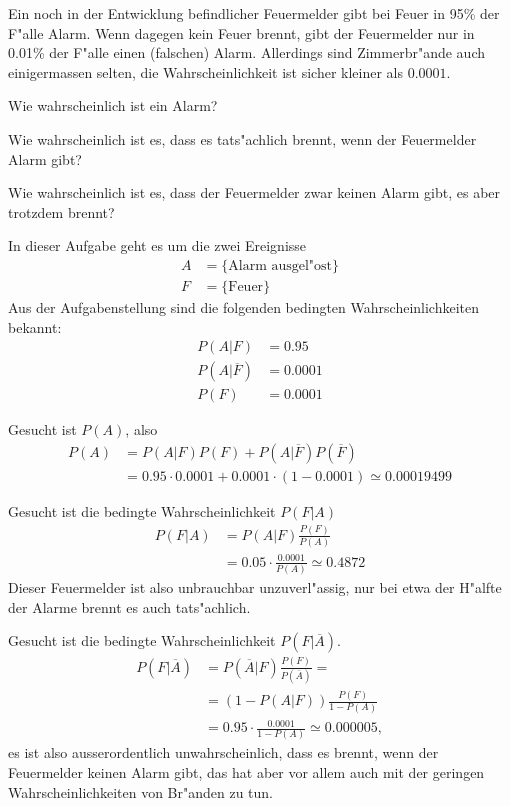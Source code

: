 Ein noch in der Entwicklung befindlicher Feuermelder gibt bei Feuer in 95\%
der F"alle Alarm. Wenn dagegen kein Feuer brennt, gibt der Feuermelder
nur in 0.01\% der F"alle einen (falschen) Alarm. Allerdings sind
Zimmerbr"ande auch einigermassen selten, die Wahrscheinlichkeit
ist sicher kleiner als $0.0001$.

\begin{teilaufgaben}
\item Wie wahrscheinlich ist ein Alarm?
\item Wie wahrscheinlich ist es, dass es tats"achlich brennt, wenn
der Feuermelder Alarm gibt?
\item Wie wahrscheinlich ist es, dass der Feuermelder zwar keinen
Alarm gibt, es aber trotzdem brennt?
\end{teilaufgaben}

\begin{loesung}
In dieser Aufgabe geht es um die zwei Ereignisse
\begin{align*}
A&=\{\text{Alarm ausgel"ost}\}
\\
F&=\{\text{Feuer}\}
\end{align*}
Aus der Aufgabenstellung sind die folgenden bedingten Wahrscheinlichkeiten
bekannt:
\begin{align*}
P(A|F)&=0.95
\\
P(A|\overline F)&=0.0001
\\
P(F)&=0.0001
\end{align*}
\begin{teilaufgaben}
\item Gesucht ist $P(A)$, also
\begin{align*}
P(A)&=P(A|F)P(F)+P(A|\overline F)P(\overline F)
\\
&=0.95\cdot 0.0001+0.0001\cdot(1-0.0001)\simeq 0.00019499
\end{align*}
\item
Gesucht ist die bedingte Wahrscheinlichkeit $P(F|A)$
\begin{align*}
P(F|A)
&=
P(A|F) \frac{P(F)}{P(A)}
\\
&=0.05\cdot\frac{0.0001}{P(A)}\simeq0.4872
\end{align*}
Dieser Feuermelder ist also unbrauchbar unzuverl"assig, nur bei etwa der
H"alfte der Alarme brennt es auch tats"achlich.
\item Gesucht ist die bedingte Wahrscheinlichkeit $P(F|\overline A)$.
\begin{align*}
P(F|\overline A)
&=
P(\overline A|F)\frac{P(F)}{P(\overline A)}=
\\
&=
(1-P(A|F))\frac{P(F)}{1-P(A)}
\\
&=
0.95\cdot \frac{0.0001}{1-P(A)}\simeq0.000005,
\end{align*}
es ist also ausserordentlich unwahrscheinlich, dass es brennt,
wenn der Feuermelder keinen Alarm gibt, das hat aber vor allem auch
mit der geringen Wahrscheinlichkeiten von Br"anden zu tun.
\end{teilaufgaben}
\end{loesung}

